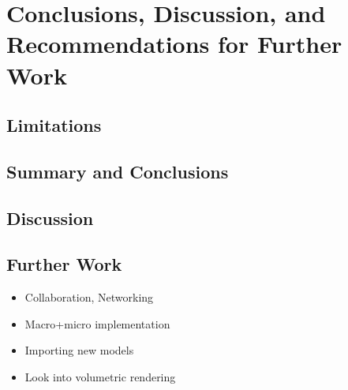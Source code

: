 \chapter[Conclusions]{Conclusions, Discussion, and Recommendations for Further Work}

\section{Limitations}
\section{Summary and Conclusions}

\section{Discussion}
\section{Further Work}\label{chap:futurework}

\begin{itemize}
    \item Collaboration, Networking
    \item Macro+micro implementation
    \item Importing new models
    \item Look into volumetric rendering  
\end{itemize}
